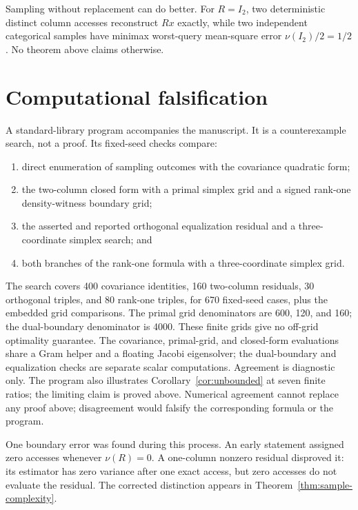 \documentclass[11pt]{article}
\theoremstyle{definition}
\begin{document}
Sampling without replacement can do better.  For $R=I_2$, two deterministic distinct column
accesses reconstruct $Rx$ exactly, while two independent categorical samples have minimax
worst-query mean-square error $\nu(I_2)/2=1/2$.  No theorem above claims otherwise.

\section{Computational falsification}

A standard-library program accompanies the manuscript.  It is a counterexample search, not a
proof.  Its fixed-seed checks compare:
\begin{enumerate}[label=\textup{(\alph*)},leftmargin=2.1em]
  \item direct enumeration of sampling outcomes with the covariance quadratic form;
  \item the two-column closed form with a primal simplex grid and a signed rank-one
  density-witness boundary grid;
  \item the asserted and reported orthogonal equalization residual and a three-coordinate simplex
  search; and
  \item both branches of the rank-one formula with a three-coordinate simplex grid.
\end{enumerate}
The search covers 400 covariance identities, 160 two-column residuals, 30 orthogonal triples,
and 80 rank-one triples, for 670 fixed-seed cases, plus the embedded grid comparisons.  The primal
grid denominators are 600, 120, and 160; the dual-boundary denominator is 4000.  These finite
grids give no off-grid optimality guarantee.  The covariance, primal-grid, and closed-form
evaluations share a Gram helper and a floating Jacobi eigensolver; the dual-boundary and
equalization checks are separate scalar computations.  Agreement is diagnostic only.  The
program also illustrates Corollary~\ref{cor:unbounded} at seven finite ratios; the limiting claim is
proved above.  Numerical agreement cannot replace any proof above; disagreement would falsify the
corresponding formula or the program.

One boundary error was found during this process.  An early statement assigned zero accesses
whenever $\nu(R)=0$.  A one-column nonzero residual disproved it: its estimator has zero variance
after one exact access, but zero accesses do not evaluate the residual.  The corrected distinction
appears in Theorem~\ref{thm:sample-complexity}.
\end{document}
